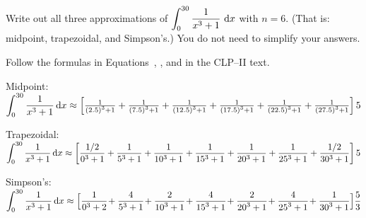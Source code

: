 \subsection*{\Procedural}
\begin{Mquestion}\label{prob_s1.11_int1}
Write out all three approximations of $\displaystyle\int_0^{30} \frac{1}{x^3+1}~\mathrm{d}x$ with $n=6$. (That is: midpoint, trapezoidal, and Simpson's.) You do not need to simplify your answers.
\end{Mquestion}
\begin{hint}
Follow the formulas in Equations~,
, and  in the CLP--II text.
\end{hint}
\begin{answer}

Midpoint:\\[10pt]
$\displaystyle
\int_0^{30} \frac{1}{x^3+1}\,\mathrm{d}x\approx\left[\tfrac{1}{\left(2.5\right)^3+1}
+\tfrac{1}{\left(7.5\right)^3+1}
+\tfrac{1}{\left(12.5\right)^3+1}
+\tfrac{1}{\left(17.5\right)^3+1}
+\tfrac{1}{\left(22.5\right)^3+1}
+\tfrac{1}{\left(27.5\right)^3+1}
\right]5
$

Trapezoidal:\\[10pt]
$\displaystyle\int_0^{30} \frac{1}{x^3+1}\,\mathrm{d}x
\approx\left[
\frac{1/2}{0^3+1}+
\frac{1}{5^3+1}+
\frac{1}{10^3+1}+
\frac{1}{15^3+1}+
\frac{1}{20^3+1}+
\frac{1}{25^3+1}+
\frac{1/2}{30^3+1}
\right]5$

Simpson's:\\[10pt]
$
\displaystyle\int_0^{30} \frac{1}{x^3+1}\,\mathrm{d}x\approx
\Big[\frac{1}{{0}^3+2}\!+\frac{4}{{5}^3+1}\!+\frac{2}{{10}^3+1}\!+\frac{4}{{15}^3+1}\!+\frac{2}{{20}^3+1}\!+\frac{4}{{25}^3+1}\!+ \frac{1}{{30}^3+1}\Big]\frac{5}{3}
$
\end{answer}
